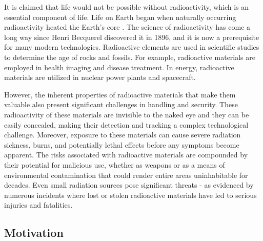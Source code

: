 \documentclass[../report.tex]{subfiles}
\begin{document}
    It is claimed that life would not be possible without radioactivity, which is an essential component of life. Life on Earth began when naturally occurring radioactivity heated
    the Earth's core \cite{DOEExplainsRadioactivity}. The science of radioactivity has come a long way since Henri Becquerel discovered it in 1896, and it is now a prerequisite for
    many modern technologies. Radioactive elements are used in scientific studies to determine the age of rocks and fossils. For example, radioactive materials are
    employed in health imaging and disease treatment. In energy, radioactive materials are utilized in nuclear power plants and spacecraft.


    However, the inherent properties of radioactive materials that make them valuable also present significant challenges in handling and security. These radioactivity 
    of these materials are invisible to the naked eye and they can be easily concealed, making their detection and tracking a complex technological challenge. 
    Moreover, exposure to these materials can cause severe radiation sickness, burns, and potentially lethal effects before any symptoms become apparent. The risks 
    associated with radioactive materials are compounded by their potential for malicious use, whether as weapons or as a means of environmental contamination that 
    could render entire areas uninhabitable for decades. Even small radiation sources pose significant threats - as evidenced by numerous incidents where lost or 
    stolen radioactive materials have led to serious injuries and fatalities.    
    
    \subsection{Motivation}
    \label{sec:introduction:motivation}
\end{document}
